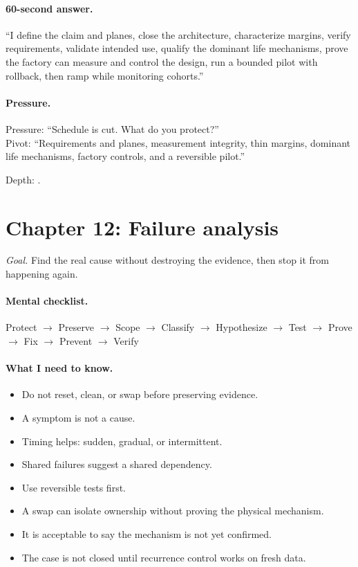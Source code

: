 \paragraph{60-second answer.}
``I define the claim and planes, close the architecture, characterize margins,
verify requirements, validate intended use, qualify the dominant life
mechanisms, prove the factory can measure and control the design, run a
bounded pilot with rollback, then ramp while monitoring cohorts.''

\paragraph{Pressure.}
Pressure: ``Schedule is cut. What do you protect?''\\
Pivot: ``Requirements and planes, measurement integrity, thin margins,
dominant life mechanisms, factory controls, and a reversible pilot.''

\footnotesize Depth: .

\clearpage
\section{Chapter 12: Failure analysis}
\label{sec:cheat-ch11}

\textit{Goal.} Find the real cause without destroying the evidence, then stop it
from happening again.

\paragraph{Mental checklist.}
Protect $\rightarrow$ Preserve $\rightarrow$ Scope $\rightarrow$ Classify
$\rightarrow$ Hypothesize $\rightarrow$ Test $\rightarrow$ Prove $\rightarrow$
Fix $\rightarrow$ Prevent $\rightarrow$ Verify

\paragraph{What I need to know.}
\begin{itemize}
\item Do not reset, clean, or swap before preserving evidence.
\item A symptom is not a cause.
\item Timing helps: sudden, gradual, or intermittent.
\item Shared failures suggest a shared dependency.
\item Use reversible tests first.
\item A swap can isolate ownership without proving the physical mechanism.
\item It is acceptable to say the mechanism is not yet confirmed.
\item The case is not closed until recurrence control works on fresh data.
\end{itemize}

